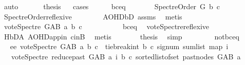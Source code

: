 \begin{isabellebody}
\ auto\ \isanewline
\ \ \isamarkupfalse%
\ \isamarkupfalse%
\ {\isacharquery}{\kern0pt}thesis\isanewline
\ \ \isamarkupfalse%
{\isacharparenleft}{\kern0pt}cases{\isacharparenright}{\kern0pt}\isanewline
\ \ \ \ \isamarkupfalse%
\ b{\isacharunderscore}{\kern0pt}c{\isacharunderscore}{\kern0pt}eq\isanewline
\ \ \ \ \isamarkupfalse%
\ \isamarkupfalse%
\ {\isachardoublequoteopen}Spectre{\isacharunderscore}{\kern0pt}Order\ G\ b\ c{\isachardoublequoteclose}\ \isamarkupfalse%
\ Spectre{\isacharunderscore}{\kern0pt}Order{\isacharunderscore}{\kern0pt}reflexive\isanewline
\ \ \ \ \ \ \ \ AOHD{\isachardot}{\kern0pt}bD\ assms\ \isamarkupfalse%
\ metis\isanewline
\ \ \ \ \isamarkupfalse%
\ \isamarkupfalse%
\ {\isachardoublequoteopen}vote{\isacharunderscore}{\kern0pt}Spectre\ G{\isacharunderscore}{\kern0pt}AB\ a\ b\ c\ {\isacharequal}{\kern0pt}\ {}{\isachardoublequoteclose}\ \isanewline
\ \ \ \ \ \ \isamarkupfalse%
\ b{\isacharunderscore}{\kern0pt}c{\isacharunderscore}{\kern0pt}eq\ \isamarkupfalse%
\ vote{\isacharunderscore}{\kern0pt}Spectre{\isacharunderscore}{\kern0pt}reflexive\ \isanewline
\ \ \ \ \ \ \isamarkupfalse%
\ H{}{\isachardot}{\kern0pt}bD{\isacharunderscore}{\kern0pt}A\ AOHD{\isachardot}{\kern0pt}app{\isacharunderscore}{\kern0pt}in{}\ c{\isacharunderscore}{\kern0pt}inB\ \isamarkupfalse%
\ metis\isanewline
\ \ \ \ \isamarkupfalse%
\ \isamarkupfalse%
\ {\isacharquery}{\kern0pt}thesis\ \isamarkupfalse%
\ simp\isanewline
\ \ \isamarkupfalse%
\isanewline
\ \ \ \ \isamarkupfalse%
\ not{\isacharunderscore}{\kern0pt}b{\isacharunderscore}{\kern0pt}c{\isacharunderscore}{\kern0pt}eq\isanewline
\ \ \ \ \isamarkupfalse%
\ \isamarkupfalse%
\ ee{}{\isacharcolon}{\kern0pt}\ {\isachardoublequoteopen}vote{\isacharunderscore}{\kern0pt}Spectre\ G{\isacharunderscore}{\kern0pt}AB\ a\ b\ c\ {\isacharequal}{\kern0pt}\ {\isacharparenleft}{\kern0pt}tie{\isacharunderscore}{\kern0pt}break{\isacharunderscore}{\kern0pt}int\ b\ c\ {\isacharparenleft}{\kern0pt}signum\ {\isacharparenleft}{\kern0pt}sum{\isacharunderscore}{\kern0pt}list\ {\isacharparenleft}{\kern0pt}map\ {\isacharparenleft}{\kern0pt}{\isasymlambda}i{\isachardot}{\kern0pt}\isanewline
\ \ \ {\isacharparenleft}{\kern0pt}vote{\isacharunderscore}{\kern0pt}Spectre\ {\isacharparenleft}{\kern0pt}reduce{\isacharunderscore}{\kern0pt}past\ G{\isacharunderscore}{\kern0pt}AB\ a{\isacharparenright}{\kern0pt}\ i\ b\ c{\isacharparenright}{\kern0pt}{\isacharparenright}{\kern0pt}\ {\isacharparenleft}{\kern0pt}sorted{\isacharunderscore}{\kern0pt}list{\isacharunderscore}{\kern0pt}of{\isacharunderscore}{\kern0pt}set\ {\isacharparenleft}{\kern0pt}past{\isacharunderscore}{\kern0pt}nodes\ G{\isacharunderscore}{\kern0pt}AB\ a{\isacharparenright}{\kern0pt}{\isacharparenright}{\kern0pt}{\isacharparenright}{\kern0pt}{\isacharparenright}{\kern0pt}{\isacharparenright}{\kern0pt}{\isacharparenright}{\kern0pt}{\isachardoublequoteclose}\isanewline

\end{isabellebody}
